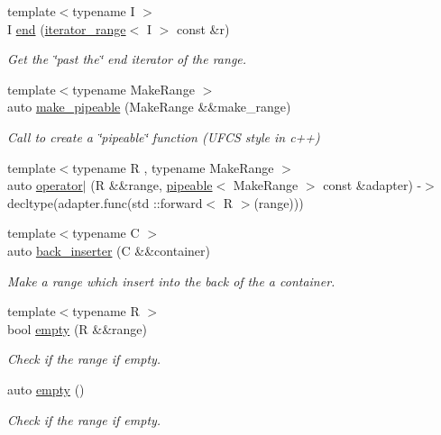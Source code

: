 \begin{DoxyCompactItemize}
{\footnotesize template$<$typename I $>$ }\\I \mbox{\hyperlink{namespacerah_a6b31fe80bf81abf3149df010cb265e20}{end}} (\mbox{\hyperlink{structrah_1_1iterator__range}{iterator\+\_\+range}}$<$ I $>$ const \&r)
\begin{DoxyCompactList}\small\item\em Get the \char`\"{}past the\char`\"{} end iterator of the range. \end{DoxyCompactList}\item 
{\footnotesize template$<$typename Make\+Range $>$ }\\auto \mbox{\hyperlink{namespacerah_a274b78c4c0af5dd58ce280f02223fb55}{make\+\_\+pipeable}} (Make\+Range \&\&make\+\_\+range)
\begin{DoxyCompactList}\small\item\em Call to create a \char`\"{}pipeable\char`\"{} function (U\+F\+CS style in c++) \end{DoxyCompactList}\item 
{\footnotesize template$<$typename R , typename Make\+Range $>$ }\\auto \mbox{\hyperlink{namespacerah_ab1ae71c44092414b8a22379bc0d3cd34}{operator$\vert$}} (R \&\&range, \mbox{\hyperlink{structrah_1_1pipeable}{pipeable}}$<$ Make\+Range $>$ const \&adapter) -\/$>$ decltype(adapter.\+func(std \+::forward$<$ R $>$(range)))
\item 
{\footnotesize template$<$typename C $>$ }\\auto \mbox{\hyperlink{namespacerah_a0698f952bc3c4f1961929bbddb5812fe}{back\+\_\+inserter}} (C \&\&container)
\begin{DoxyCompactList}\small\item\em Make a range which insert into the back of the a container. \end{DoxyCompactList}\item 
{\footnotesize template$<$typename R $>$ }\\bool \mbox{\hyperlink{namespacerah_a51feb1497566c28de396f50735fd259b}{empty}} (R \&\&range)
\begin{DoxyCompactList}\small\item\em Check if the range if empty. \end{DoxyCompactList}\item 
auto \mbox{\hyperlink{namespacerah_a6ceb90c934b1c4927ab4e08b985ef6c5}{empty}} ()
\begin{DoxyCompactList}\small\item\em Check if the range if empty. \end{DoxyCompactList}\item 

\end{DoxyCompactItemize}
